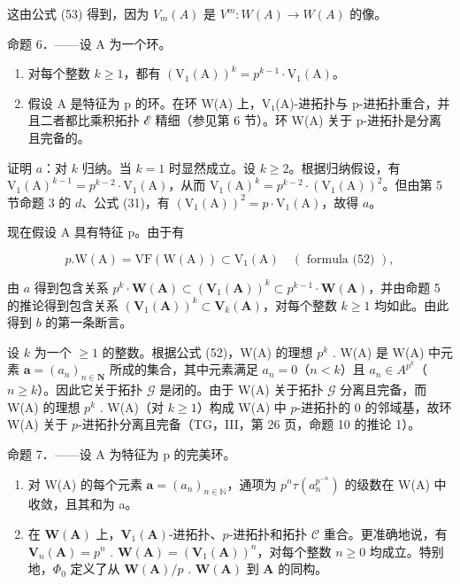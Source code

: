 这由公式 (53) 得到，因为 \(V_{m}(A)\) 是 \(V^{m}:W(A)\to W(A)\) 的像。

命题 6．——设 A 为一个环。

\begin{enumerate}
\def\labelenumi{\alph{enumi})}
\item
  对每个整数 \(k \geqslant 1\)，都有 \((\mathrm{V}_1(\mathrm{A}))^k = p^{k-1} \cdot \mathrm{V}_1(\mathrm{A})\)。
\item
  假设 A 是特征为 p 的环。在环 W(A) 上，V₁(A)-进拓扑与 p-进拓扑重合，并且二者都比乘积拓扑 ℰ 精细（参见第 6 节）。环 W(A) 关于 p-进拓扑是分离且完备的。
\end{enumerate}

证明 \(a\)：对 \(k\) 归纳。当 \(k = 1\) 时显然成立。设 \(k \geqslant 2\)。根据归纳假设，有 \(\mathrm{V}_{1}(\mathrm{A})^{k-1} = p^{k-2} \cdot \mathrm{V}_{1}(\mathrm{A})\)，从而 \(\mathrm{V}_{1}(\mathrm{A})^{k} = p^{k-2} \cdot (\mathrm{V}_{1}(\mathrm{A}))^{2}\)。但由第 5 节命题 3 的 \(d\)、公式 (31)，有 \((\mathrm{V}_{1}(\mathrm{A}))^{2} = p \cdot \mathrm{V}_{1}(\mathrm{A})\)，故得 \(a\)。

现在假设 A 具有特征 p。由于有

\[
p. \mathrm{W} (\mathrm{A}) = \mathrm{VF} (\mathrm{W} (\mathrm{A})) \subset \mathrm{V} _ {1} (\mathrm{A}) \quad (\text { formula (52) }),
\]

由 \(a\) 得到包含关系 \(p^{k} \cdot \mathbf{W}(\mathbf{A}) \subset (\mathbf{V}_{1}(\mathbf{A}))^{k} \subset p^{k-1} \cdot \mathbf{W}(\mathbf{A})\)，并由命题 5 的推论得到包含关系 \((\mathbf{V}_{1}(\mathbf{A}))^{k} \subset \mathbf{V}_{k}(\mathbf{A})\)，对每个整数 \(k \geqslant 1\) 均如此。由此得到 \(b\) 的第一条断言。

设 \(k\) 为一个 \(\geqslant 1\) 的整数。根据公式 (52)，W(A) 的理想 \(p^{k}\) . W(A) 是 W(A) 中元素 \(\boldsymbol{a} = (a_{n})_{n \in \mathbf{N}}\) 所成的集合，其中元素满足 \(a_{n} = 0\)（\(n < k\)）且 \(a_{n} \in A^{p^{k}}\)（\(n \geqslant k\)）。因此它关于拓扑 \(\mathcal{G}\) 是闭的。由于 W(A) 关于拓扑 \(\mathcal{G}\) 分离且完备，而 W(A) 的理想 \(p^{k}\) . W(A)（对 \(k \geqslant 1\)）构成 W(A) 中 \(p\)-进拓扑的 0 的邻域基，故环 W(A) 关于 \(p\)-进拓扑分离且完备（TG，III，第 26 页，命题 10 的推论 1）。

命题 7．——设 A 为特征为 p 的完美环。

\begin{enumerate}
\def\labelenumi{\alph{enumi})}
\item
  对 W(A) 的每个元素 \(\boldsymbol{a} = (a_{n})_{n \in \mathbb{N}}\)，通项为 \(p^{n}\tau(a_{n}^{p^{-n}})\) 的级数在 W(A) 中收敛，且其和为 a。
\item
  在 \(\mathbf{W}(\mathbf{A})\) 上，\(\mathbf{V}_1(\mathbf{A})\)-进拓扑、\(p\)-进拓扑和拓扑 \(\mathcal{C}\) 重合。更准确地说，有 \(\mathbf{V}_n(\mathbf{A}) = p^n\) . \(\mathbf{W}(\mathbf{A}) = (\mathbf{V}_1(\mathbf{A}))^n\)，对每个整数 \(n \geqslant 0\) 均成立。特别地，\(\Phi_0\) 定义了从 \(\mathbf{W}(\mathbf{A})/p\) . \(\mathbf{W}(\mathbf{A})\) 到 \(\mathbf{A}\) 的同构。
\end{enumerate}

